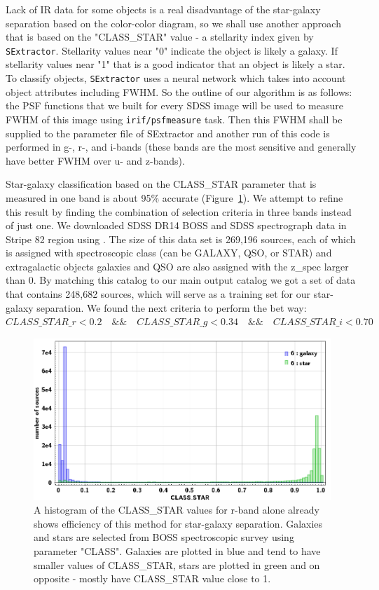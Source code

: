 Lack of IR data for some objects is a real disadvantage of the star-galaxy separation based on the color-color diagram, so we shall use another approach that is based on the "CLASS\_STAR" value - a stellarity index given by {\tt SExtractor}. Stellarity values near "0" indicate the object is likely a galaxy. If stellarity values near "1" that is a good indicator that an object is likely a star. To classify objects, {\tt SExtractor} uses a neural network which takes into account object attributes including FWHM. 
So the outline of our algorithm is as follows: the PSF functions that we built for every SDSS image will be used to measure FWHM of this image using {\tt irif/psfmeasure} task. Then this FWHM shall be supplied to the parameter file of SExtractor and another run of this code is performed in g-, r-, and i-bands (these bands are the most sensitive and generally have better FWHM over u- and z-bands).

Star-galaxy classification based on the CLASS\_STAR parameter that is measured in one band is about 95\% accurate (Figure~\ref{fig:sgs_hist}). We attempt to refine this result by finding the combination of selection criteria in three bands instead of just one.
We downloaded SDSS DR14 BOSS and SDSS spectrograph data in Stripe 82 region using . The size of this data set is 269,196 sources, each of which is assigned with spectroscopic class (can be GALAXY, QSO, or STAR) and extragalactic objects galaxies and QSO are also assigned with the z\_spec larger than 0. By matching this catalog to our main output catalog we got a set of data that contains 248,682 sources, which will serve as a training set for our star-galaxy separation.
We found the next criteria to perform the bet way:
$CLASS\_STAR\_r<0.2 \quad \&\& \quad CLASS\_STAR\_g<0.34 \quad \&\& \quad CLASS\_STAR\_i<0.70$\\
\begin{figure}[!ht]
\includegraphics[width=5.7in]{Figures/histogram_class_star.png}
\caption{A histogram of the CLASS\_STAR values for r-band alone already shows efficiency of this method for star-galaxy separation. Galaxies and stars are selected from BOSS spectroscopic survey using parameter "CLASS". Galaxies are plotted in blue and tend to have smaller values of CLASS\_STAR, stars are plotted in green and on opposite - mostly have CLASS\_STAR value close to 1.}
\label{fig:sgs_hist}
\end{figure}

